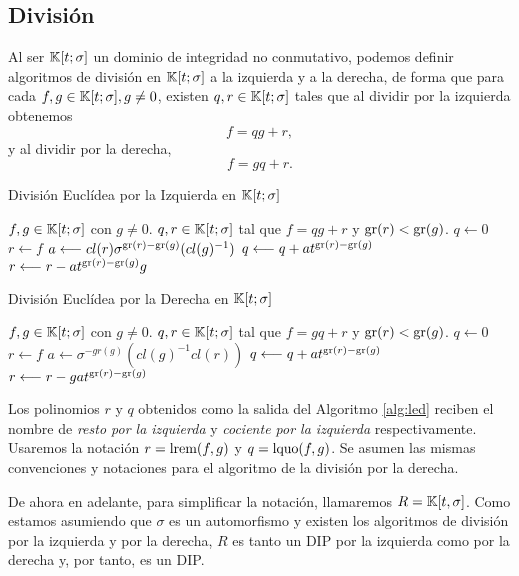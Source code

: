 \subsection{División}

Al ser $\mathbb{K}[t;\sigma]$ un dominio de integridad no conmutativo, podemos definir algoritmos de división en $\mathbb{K}[t;\sigma]$ a la izquierda y a la derecha, de forma que para cada $f,g \in \mathbb{K}[t;\sigma], g \neq 0$, existen $q,r \in \mathbb{K}[t;\sigma]$ tales que al dividir por la izquierda obtenemos 
$$f = qg + r,$$ y al dividir por la derecha, $$f = gq + r.$$

\begin{algorithm}[h]\label{alg:led}
    \caption{División Euclídea por la Izquierda en $\mathbb{K}[t;\sigma]$}
    \begin{algorithmic}[1]
    \REQUIRE $f,g \in \mathbb{K}[t;\sigma]$ con $g \neq 0$.
    \ENSURE $q,r \in \mathbb{K}[t;\sigma]$ tal que $f = qg + r$ y $\operatorname{gr}(r) <  \operatorname{gr}(g)$.
    \STATE $q \longleftarrow 0$
    \STATE $r \longleftarrow f$
    \STATE $a \longleftarrow cl(r)\sigma^{\operatorname{gr}(r) - \operatorname{gr}(g)}(cl(g)^{-1})$
    \STATE $q \longleftarrow q + at^{\operatorname{gr}(r) - \operatorname{gr}(g)}$
    \STATE $r\longleftarrow r - at^{\operatorname{gr}(r) - \operatorname{gr}(g)}g$
    \ENDWHILE
    \end{algorithmic}
\end{algorithm}
\phantom{}
\begin{algorithm}[h] \label{alg:red}
    \caption{División Euclídea por la Derecha en $\mathbb{K}[t;\sigma]$}
    \begin{algorithmic}[1]
    \REQUIRE $f,g \in \mathbb{K}[t;\sigma]$ con $g \neq 0$.
    \ENSURE $q,r \in \mathbb{K}[t;\sigma]$ tal que $f = gq + r$ y $\operatorname{gr}(r) <  \operatorname{gr}(g)$.
    \STATE $q \longleftarrow 0$
    \STATE $r \longleftarrow f$
    \STATE $a \longleftarrow \sigma^{-gr(g)}(cl(g)^{-1}cl(r))$
    \STATE $q \longleftarrow q + at^{\operatorname{gr}(r) - \operatorname{gr}(g)}$
    \STATE $r\longleftarrow r - gat^{\operatorname{gr}(r) - \operatorname{gr}(g)}$
    \ENDWHILE
    \end{algorithmic}
\end{algorithm}

Los polinomios $r$ y $q$ obtenidos como la salida del Algoritmo \ref{alg:led} reciben el nombre de \emph{resto por la izquierda} y \emph{cociente por la izquierda} respectivamente. Usaremos la notación $r = \text{lrem}(f,g)$ y $q = \text{lquo}(f,g)$. Se asumen las mismas convenciones y notaciones para el algoritmo de la división por la derecha.

De ahora en adelante, para simplificar la notación, llamaremos $R = \mathbb{K}[t,\sigma]$. Como estamos asumiendo que $\sigma$ es un automorfismo y existen los algoritmos de división por la izquierda y por la derecha, $R$ es tanto un DIP por la izquierda como por la derecha y, por tanto, es un DIP.


